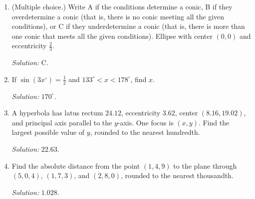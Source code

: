 \documentclass[11pt]{article}
\begin{document}
\begin{enumerate}[label=\textbf{\arabic*.}]
\item (Multiple choice.) Write A if the conditions determine a conic, B if they overdetermine a conic (that is, there is no conic meeting all the given conditions), or C if they underdetermine a conic (that is, there is more than one conic that meets all the given conditions). Ellipse with center $(0,0)$ and eccentricity $\frac23$.\par\textit{Solution: }C.

\item If $\sin(3x^\circ)=\frac12$ and $133^\circ<x<178^\circ$, find $x$.\par\textit{Solution: }$170^\circ$.

\item A hyperbola has latus rectum $24.12$, eccentricity $3.62$, center $(8.16,19.02)$, and principal axis parallel to the $y$-axis. One focus is $(x,y)$. Find the largest possible value of $y$, rounded to the nearest hundredth.\par\textit{Solution: }$22.63$.

\item Find the absolute distance from the point $(1,4,9)$ to the plane through $(5,0,4)$, $(1,7,3)$, and $(2,8,0)$, rounded to the nearest thousandth.\par\textit{Solution: }$1.028$.
\end{enumerate}
\end{document}
